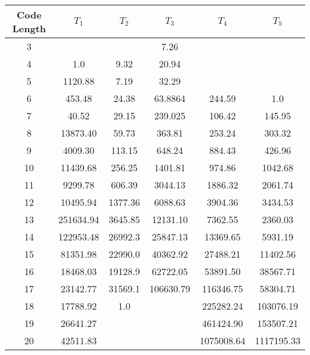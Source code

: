 \begin{table*} \centering
{}
\begin{tabular}{@{}cccccc@{}}\toprule
Code Length & $T_1$ & $T_2$ & $T_3$ & $T_4$ & $T_5$ \\ \midrule
 3 	&           	  &         	   &  7.26        		 &                 		&                	\\
 4 	&  1.0      	  & 9.32    	   &  20.94       		 &                 		&                	\\
 5 	&  1120.88  	  & 7.19    	   &  32.29       		 &                 		&                	\\
 6 	&  453.48   	  & 24.38   	   &  63.8864     		 &   244.59        		&   1.0          	\\
 7 	&  40.52    	  & 29.15   	   &  239.025     		 &   106.42        		&   145.95       	\\
 8 	&  13873.40 	  & 59.73   	   &  363.81      		 &   253.24        		&   303.32       	\\
 9 	&  4009.30  	  & 113.15  	   &  648.24      		 &   884.43        		&   426.96       	\\
 10	&  11439.68 	  & 256.25  	   &  1401.81     		 &   974.86        		&   1042.68      	\\
 11	&  9299.78  	  & 606.39  	   &  3044.13     		 &   1886.32       		&   2061.74      	\\
 12	&  10495.94 	  & 1377.36 	   &  6088.63     		 &   3904.36       		&   3434.53      	\\
 13	&  251634.94	  & 3645.85 	   &  12131.10    		 &   7362.55       		&   2360.03      	\\
 14	&  122953.48	  & 26992.3 	   &  25847.13    		 &   13369.65      		&   5931.19      	\\
 15	&  81351.98 	  & 22990.0 	   &  40362.92    		 &   27488.21      		&   11402.56     	\\
 16	&  18468.03 	  & 19128.9 	   &  62722.05    		 &   53891.50      		&   38567.71     	\\
 17	&  23142.77 	  & 31569.1 	   &  106630.79   		 &   116346.75     		&   58304.71     	\\
 18	&  17788.92 	  & 1.0     	   &              		 &   225282.24     		&   103076.19    	\\
 19	&  26641.27 	  &         	   &              		 &   461424.90     		&   153507.21    	\\
 20	&  42511.83 	  &         	   &              		 &   1075008.64    		&   1117195.33   	\\

\end{tabular}
\end{table*}
